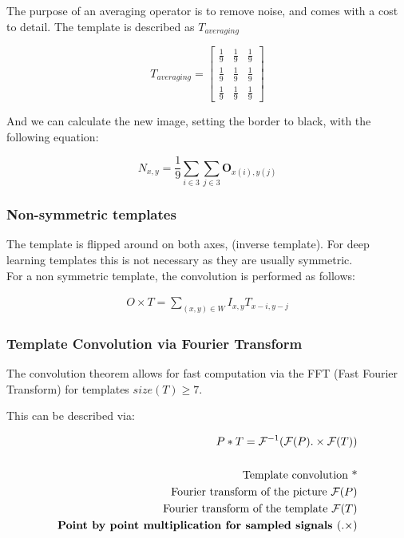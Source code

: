 The purpose of an averaging operator is to remove noise, and comes with a cost to detail. The template is described as $T_{averaging}$

\begin{equation}
T_{averaging}=
    \begin{bmatrix}
    \frac{1}{9} & \frac{1}{9} & \frac{1}{9} \\
    \frac{1}{9} & \frac{1}{9} & \frac{1}{9} \\
    \frac{1}{9} & \frac{1}{9} & \frac{1}{9}
    \end{bmatrix}
\end{equation}

And we can calculate the new image, setting the border to black, with the following equation:

\begin{equation}
    N_{x,y} = \frac{1}{9} \sum_{i \in 3} \sum_{j \in 3} \mathbf{O}_{x(i),y(j)}
\end{equation}

\subsubsection{Non-symmetric templates}
The template is flipped around on both axes, (inverse template). For deep learning templates this is not necessary as they are usually symmetric.
\\
For a non symmetric template, the convolution is performed as follows:

\begin{align}
    O \times T = \sum_{(x,y)\in W} I_{x,y} T_{x-i,y-j}
\end{align}

\subsubsection{Template Convolution via Fourier Transform}

The convolution theorem allows for fast computation via the FFT (Fast Fourier Transform) for templates $size(T) \geq 7$.

This can be described via:

\begin{align}
    P * T = \mathcal{F}^{-1}(\mathcal{F}(P).\times\mathcal{F}(T)) \\ \\
    \text{Template convolution *} \\
    \text{Fourier transform of the picture }\mathcal{F}(P) \\
    \text{Fourier transform of the template }\mathcal{F}(T) \\
    \text{\textbf{Point by point multiplication for sampled signals }} (.\times)
\end{align}

